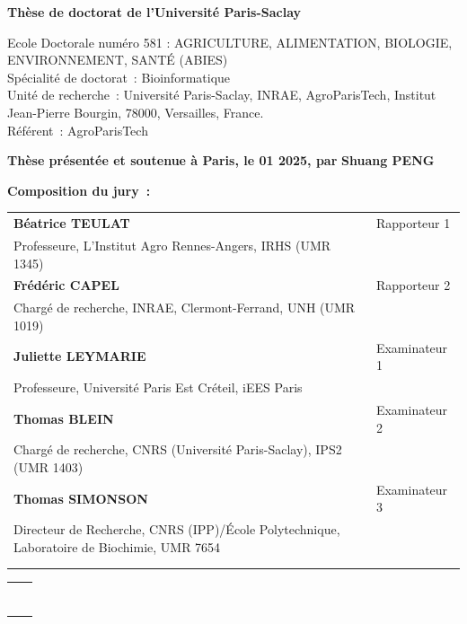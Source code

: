 \documentclass[12pt,a4paper]{reedthesis}
\begin{document}
\begin{titlepage}
\normalsize
\vspace{15mm}

\color{black}
\textbf{Thèse de doctorat de l'Université Paris-Saclay}

\vspace{10mm}

\hspace*{-0.7cm}Ecole Doctorale numéro 581 : AGRICULTURE, ALIMENTATION, BIOLOGIE, ENVIRONNEMENT, SANTÉ (ABIES)\\
\small Spécialité de doctorat~: Bioinformatique\\
\footnotesize Unité de recherche~: Université Paris-Saclay, INRAE, AgroParisTech, Institut Jean-Pierre Bourgin, 78000, Versailles, France.\\
\footnotesize Référent~: AgroParisTech

\vspace{10mm}

\textbf{Thèse présentée et soutenue à Paris, le 01 2025, par}
\bigskip
\Large {\color{Prune} \textbf{Shuang PENG}}

\vspace{15mm}

\flushleft \normalsize \textbf{Composition du jury~:}
\bigskip

\scriptsize
{}
\begin{tabular}{|p{8cm}l}
\textbf{Béatrice TEULAT} &  Rapporteur 1\\
Professeure, L'Institut Agro Rennes-Angers, IRHS (UMR 1345) & \\
\textbf{Frédéric CAPEL} &  Rapporteur 2\\
Chargé de recherche, INRAE, Clermont-Ferrand, UNH (UMR 1019) & \\
\textbf{Juliette LEYMARIE} &  Examinateur 1\\
Professeure, Université Paris Est Créteil, iEES Paris & \\
\textbf{Thomas BLEIN} &  Examinateur 2\\
Chargé de recherche, CNRS (Université Paris-Saclay), IPS2 (UMR 1403) & \\
\textbf{Thomas SIMONSON} &  Examinateur 3\\
Directeur de Recherche, CNRS (IPP)/École Polytechnique, Laboratoire de Biochimie, UMR 7654 & \\
\textbf{} &  \\
 & \\
\end{tabular}

\begin{tabular}{p{8cm}l}
& \\
\textbf{} &  \\
 & \\
\textbf{} &  \\
 & \\
\textbf{} &  \\
 & \\
\end{tabular}

\end{titlepage}
\end{document}
